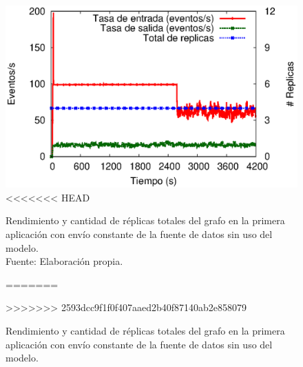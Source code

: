 \begin{figure}[!ht]
	\centering
	\captionsetup{justification=centering}
	\includegraphics[scale=0.65]{images/exp/app1/uniform/sm/processSystem.eps}
<<<<<<< HEAD
    \caption[Rendimiento y cantidad de réplicas totales del grafo en la primera aplicación con envío constante de la fuente de datos sin uso del modelo.]{Rendimiento y cantidad de réplicas totales del grafo en la primera aplicación con envío constante de la fuente de datos sin uso del modelo.\\Fuente: Elaboración propia.}
=======
    \caption{Rendimiento y cantidad de r\'eplicas totales del grafo en la primera aplicaci\'on con env\'io constante de la fuente de datos sin uso del modelo.}
>>>>>>> 2593dcc9f1f0f407aaed2b40f87140ab2e858079
	\label{fig:app1-uniform-processSystem-sm}
\end{figure}



